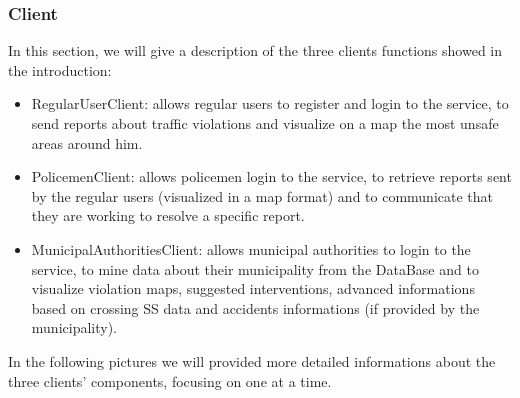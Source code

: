 \subsubsection{Client}
In this section, we will give a description of the three clients functions showed in the introduction:
\begin{itemize}
	\item RegularUserClient: allows regular users to register and login to the service, to send reports about traffic violations and visualize on a map the most unsafe areas around him.
	\item PolicemenClient: allows policemen login to the service, to retrieve reports sent by the regular users (visualized in a map format) and to communicate that they are working to resolve a specific report.
	\item MunicipalAuthoritiesClient: allows municipal authorities to login to the service, to mine data about their municipality from the DataBase and to visualize violation maps, suggested interventions, advanced informations based on crossing SS data and accidents informations (if provided by the municipality).
\end{itemize}
In the following pictures we will provided more detailed informations about the three clients' components, focusing on one at a time.

